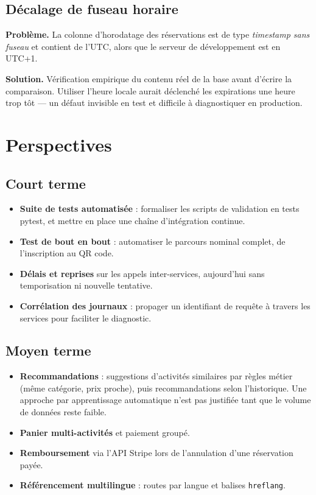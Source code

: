 \documentclass[11pt,a4paper]{report}
\begin{document}
\section{Décalage de fuseau horaire}

\textbf{Problème.} La colonne d'horodatage des réservations est de type
\emph{timestamp sans fuseau} et contient de l'UTC, alors que le serveur de
développement est en UTC+1.

\textbf{Solution.} Vérification empirique du contenu réel de la base avant
d'écrire la comparaison. Utiliser l'heure locale aurait déclenché les
expirations une heure trop tôt — un défaut invisible en test et difficile à
diagnostiquer en production.

\chapter{Perspectives}

\section{Court terme}

\begin{itemize}
  \item \textbf{Suite de tests automatisée} : formaliser les scripts de
    validation en tests pytest, et mettre en place une chaîne d'intégration
    continue.
  \item \textbf{Test de bout en bout} : automatiser le parcours nominal complet,
    de l'inscription au QR code.
  \item \textbf{Délais et reprises} sur les appels inter-services, aujourd'hui
    sans temporisation ni nouvelle tentative.
  \item \textbf{Corrélation des journaux} : propager un identifiant de requête à
    travers les services pour faciliter le diagnostic.
\end{itemize}

\section{Moyen terme}

\begin{itemize}
  \item \textbf{Recommandations} : suggestions d'activités similaires par règles
    métier (même catégorie, prix proche), puis recommandations selon
    l'historique. Une approche par apprentissage automatique n'est pas
    justifiée tant que le volume de données reste faible.
  \item \textbf{Panier multi-activités} et paiement groupé.
  \item \textbf{Remboursement} via l'API Stripe lors de l'annulation d'une
    réservation payée.
  \item \textbf{Référencement multilingue} : routes par langue et balises
    \texttt{hreflang}.
\end{itemize}
\end{document}
